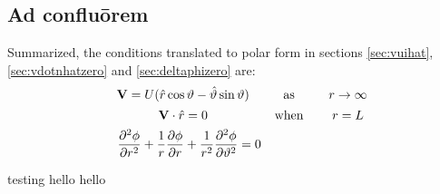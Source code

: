 \subsection{Ad confluōrem}
Summarized, the conditions translated to polar form in sections \ref{sec:vuihat}, \ref{sec:vdotnhatzero} and \ref{sec:deltaphizero} are:
$$\begin{matrix}
	&\mathbf{V}=U(\rhat\cos\theta-\thetahat\sin\theta)\quad&\text{as}\quad&r\rightarrow\infty\vecpadding\\
	&\mathbf{V}\cdot\rhat=0\quad&\text{when}\quad&r=L\vecpadding\\
	&\dfrac{\partial^2\phi}{\partial r^2}+\dfrac{1}{r}\dfrac{\partial\phi}{\partial r}+\dfrac{1}{r^2}\dfrac{\partial^2\phi}{\partial\theta^2}=0
\end{matrix}$$

testing hello hello\cite{mat132-episode25}